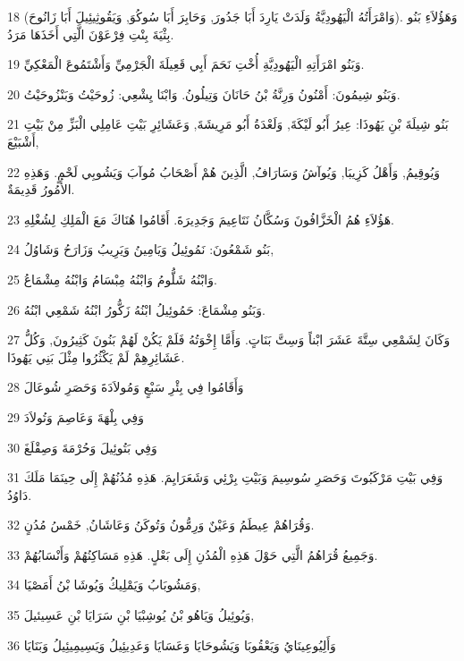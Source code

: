 \par 18 (وَامْرَأَتُهُ الْيَهُودِيَّةُ وَلَدَتْ يَارِدَ أَبَا جَدُورَ, وَحَابِرَ أَبَا سُوكُوَ, وَيَقُوثِيئِيلَ أَبَا زَانُوحَ). وَهَؤُلاَءِ بَنُو بِثْيَةَ بِنْتِ فِرْعَوْنَ الَّتِي أَخَذَهَا مَرَدُ.
\par 19 وَبَنُو امْرَأَتِهِ الْيَهُودِيَّةِ أُخْتِ نَحَمَ أَبِي قَعِيلَةَ الْجَرْمِيِّ وَأَشْتَمُوعَ الْمَعْكِيِّ.
\par 20 وَبَنُو شِيمُونَ: أَمْنُونُ وَرِنَّةُ بْنُ حَانَانَ وَتِيلُونُ. وَابْنَا يِشْعِي: زُوحَيْتُ وَبَنْزُوحَيْتُ.
\par 21 بَنُو شِيلَةَ بْنِ يَهُوذَا: عِيرُ أَبُو لَيْكَةَ, وَلَعْدَةُ أَبُو مَرِيشَةَ, وَعَشَائِرِ بَيْتِ عَامِلِي الْبَزِّ مِنْ بَيْتِ أَشْبَيْعَ,
\par 22 وَيُوقِيمُ, وَأَهْلُ كَزِيبَا, وَيُوآشُ وَسَارَافُ, الَّذِينَ هُمْ أَصْحَابُ مُوآبَ وَيَشُوبِي لَحْمٍ. وَهَذِهِ الأُمُورُ قَدِيمَةٌ.
\par 23 هَؤُلاَءِ هُمُ الْخَزَّافُونَ وَسُكَّانُ نَتَاعِيمَ وَجَدِيرَةَ. أَقَامُوا هُنَاكَ مَعَ الْمَلِكِ لِشُغْلِهِ.
\par 24 بَنُو شَمْعُونَ: نَمُوئِيلُ وَيَامِينُ وَيَرِيبُ وَزَارَحُ وَشَاوُلُ,
\par 25 وَابْنُهُ شَلُّومُ وَابْنُهُ مِبْسَامُ وَابْنُهُ مِشْمَاعُ.
\par 26 وَبَنُو مِشْمَاعَ: حَمُوئِيلُ ابْنُهُ زَكُّورُ ابْنُهُ شَمْعِي ابْنُهُ.
\par 27 وَكَانَ لِشَمْعِي سِتَّةَ عَشَرَ ابْناً وَسِتَّ بَنَاتٍ. وَأَمَّا إِخْوَتُهُ فَلَمْ يَكُنْ لَهُمْ بَنُونَ كَثِيرُونَ, وَكُلُّ عَشَائِرِهِمْ لَمْ يَكْثُرُوا مِثْلَ بَنِي يَهُوذَا.
\par 28 وَأَقَامُوا فِي بِئْرِ سَبْعٍ وَمُولاَدَةَ وَحَصَرِ شُوعَالَ
\par 29 وَفِي بِلْهَةَ وَعَاصِمَ وَتُولاَدَ
\par 30 وَفِي بَتُوئِيلَ وَحُرْمَةَ وَصِقْلَغَ
\par 31 وَفِي بَيْتِ مَرْكَبُوتَ وَحَصَرِ سُوسِيمَ وَبَيْتِ بِرْئِي وَشَعَرَايِمَ. هَذِهِ مُدُنُهُمْ إِلَى حِينَمَا مَلَكَ دَاوُدُ.
\par 32 وَقُرَاهُمْ عِيطَمُ وَعَيْنٌ وَرِمُّونُ وَتُوكَنُ وَعَاشَانُ, خَمْسُ مُدُنٍ.
\par 33 وَجَمِيعُ قُرَاهُمُ الَّتِي حَوْلَ هَذِهِ الْمُدُنِ إِلَى بَعْلٍ. هَذِهِ مَسَاكِنُهُمْ وَأَنْسَابُهُمْ.
\par 34 وَمَشُوبَابُ وَيَمْلِيكُ وَيُوشَا بْنُ أَمَصْيَا,
\par 35 وَيُوئِيلُ وَيَاهُو بْنُ يُوشِبْيَا بْنِ سَرَايَا بْنِ عَسِيئيلَ,
\par 36 وَأَلِيُوعِينَايُ وَيَعْقُوبَا وَيَشُوحَايَا وَعَسَايَا وَعَدِيئِيلُ وَيَسِيمِيئِيلُ وَبَنَايَا
